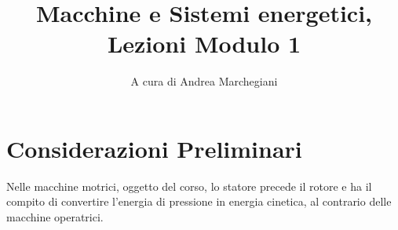 \documentclass[a4paper, 15pt]{article}
\title{Macchine e Sistemi energetici, \\ Lezioni Modulo 1}
\author{A cura di Andrea Marchegiani}
\date{}
\begin{document}
\maketitle
{}	
\tableofcontents 
\newpage

		
\part{Considerazioni Preliminari}
\begin{adjustwidth}{2in}{}
	Nelle macchine motrici, oggetto del corso, lo statore precede il rotore e ha il compito di convertire l'energia di pressione in energia cinetica, al contrario delle macchine operatrici.  
\end{adjustwidth}
\end{document}
